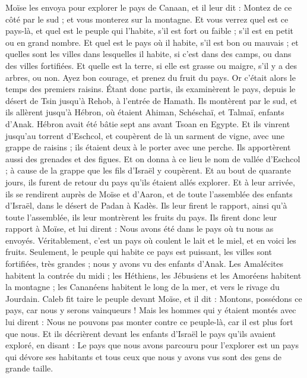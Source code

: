\begin{multicols}{2}
Moïse les envoya pour explorer le pays de Canaan, et il leur dit : Montez de ce côté par le sud ; et vous monterez sur la montagne.
Et vous verrez quel est ce pays-là, et quel est le peuple qui l’habite, s’il est fort ou faible ; s’il est en petit ou en grand nombre.
Et quel est le pays où il habite, s’il est bon ou mauvais ; et quelles sont les villes dans lesquelles il habite, si c’est dans des camps, ou dans des villes fortifiées.
Et quelle est la terre, si elle est grasse ou maigre, s’il y a des arbres, ou non. Ayez bon courage, et prenez du fruit du pays. Or c’était alors le temps des premiers raisins.
Étant donc partis, ils examinèrent le pays, depuis le désert de Tsin jusqu'à Rehob, à l'entrée de Hamath.
Ils montèrent par le sud, et ils allèrent jusqu'à Hébron, où étaient Ahiman, Schéschaï, et Talmaï, enfants d'Anak. Hébron avait été bâtie sept ans avant Tsoan en Egypte.
Et ils vinrent jusqu'au torrent d'Eschcol, et coupèrent de là un sarment de vigne, avec une grappe de raisins ; ils étaient deux à le porter avec une perche. Ils apportèrent aussi des grenades et des figues.
Et on donna à ce lieu le nom de vallée d'Eschcol ; à cause de la grappe que les fils d'Israël y coupèrent.
Et au bout de quarante jours, ils furent de retour du pays qu'ils étaient allés explorer.
Et à leur arrivée, ils se rendirent auprès de Moïse et d'Aaron, et de toute l'assemblée des enfants d'Israël, dans le désert de Padan à Kadès. Ils leur firent le rapport, ainsi qu'à toute l'assemblée, ils leur montrèrent les fruits du pays.
Ils firent donc leur rapport à Moïse, et lui dirent : Nous avons été dans le pays où tu nous as envoyés. Véritablement, c'est un pays où coulent le lait et le miel, et en voici les fruits.
Seulement, le peuple qui habite ce pays est puissant, les villes sont fortifiées, très grandes ; nous y avons vu des enfants d'Anak.
Les Amalécites habitent la contrée du midi ; les Héthiens, les Jébusiens et les Amoréens habitent la montagne ; les Cananéens habitent le long de la mer, et vers le rivage du Jourdain.
Caleb fit taire le peuple devant Moïse, et il dit : Montons, possédons ce pays, car nous y serons vainqueurs !
Mais les hommes qui y étaient montés avec lui dirent : Nous ne pouvons pas monter contre ce peuple-là, car il est plus fort que nous.
Et ils décrièrent devant les enfants d'Israël le pays qu'ils avaient exploré, en disant  : Le pays que nous avons parcouru pour l'explorer est un pays qui dévore ses habitants et  tous ceux que nous y avons vus sont des gens de grande taille.

\end{multicols}

